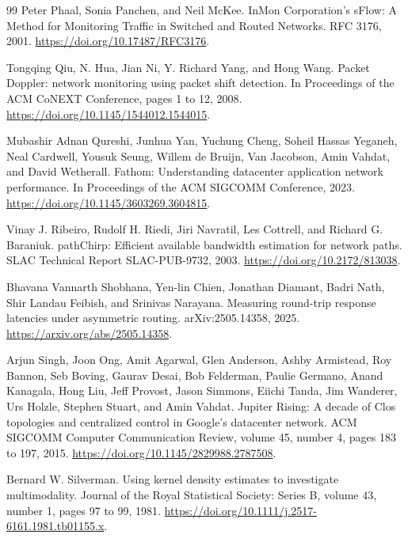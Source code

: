 \documentclass[a4paper,11pt]{report}
\begin{document}
\begin{thebibliography}{99}
Peter Phaal, Sonia Panchen, and Neil McKee.
\newblock InMon Corporation's sFlow: A Method for Monitoring Traffic in Switched and Routed Networks.
\newblock RFC 3176, 2001.
\newblock \url{https://doi.org/10.17487/RFC3176}.

Tongqing Qiu, N. Hua, Jian Ni, Y. Richard Yang, and Hong Wang.
\newblock Packet Doppler: network monitoring using packet shift detection.
\newblock In Proceedings of the ACM CoNEXT Conference, pages 1 to 12, 2008.
\newblock \url{https://doi.org/10.1145/1544012.1544015}.

Mubashir Adnan Qureshi, Junhua Yan, Yuchung Cheng, Soheil Hassas Yeganeh, Neal Cardwell, Yousuk Seung, Willem de Bruijn, Van Jacobson, Amin Vahdat, and David Wetherall.
\newblock Fathom: Understanding datacenter application network performance.
\newblock In Proceedings of the ACM SIGCOMM Conference, 2023.
\newblock \url{https://doi.org/10.1145/3603269.3604815}.

Vinay J. Ribeiro, Rudolf H. Riedi, Jiri Navratil, Les Cottrell, and Richard G. Baraniuk.
\newblock pathChirp: Efficient available bandwidth estimation for network paths.
\newblock SLAC Technical Report SLAC-PUB-9732, 2003.
\newblock \url{https://doi.org/10.2172/813038}.

Bhavana Vannarth Shobhana, Yen-lin Chien, Jonathan Diamant, Badri Nath, Shir Landau Feibish, and Srinivas Narayana.
\newblock Measuring round-trip response latencies under asymmetric routing.
\newblock arXiv:2505.14358, 2025.
\newblock \url{https://arxiv.org/abs/2505.14358}.

Arjun Singh, Joon Ong, Amit Agarwal, Glen Anderson, Ashby Armistead, Roy Bannon, Seb Boving, Gaurav Desai, Bob Felderman, Paulie Germano, Anand Kanagala, Hong Liu, Jeff Provost, Jason Simmons, Eiichi Tanda, Jim Wanderer, Urs Holzle, Stephen Stuart, and Amin Vahdat.
\newblock Jupiter Rising: A decade of Clos topologies and centralized control in Google's datacenter network.
\newblock ACM SIGCOMM Computer Communication Review, volume 45, number 4, pages 183 to 197, 2015.
\newblock \url{https://doi.org/10.1145/2829988.2787508}.

Bernard W. Silverman.
\newblock Using kernel density estimates to investigate multimodality.
\newblock Journal of the Royal Statistical Society: Series B, volume 43, number 1, pages 97 to 99, 1981.
\newblock \url{https://doi.org/10.1111/j.2517-6161.1981.tb01155.x}.


\end{thebibliography}
\end{document}

